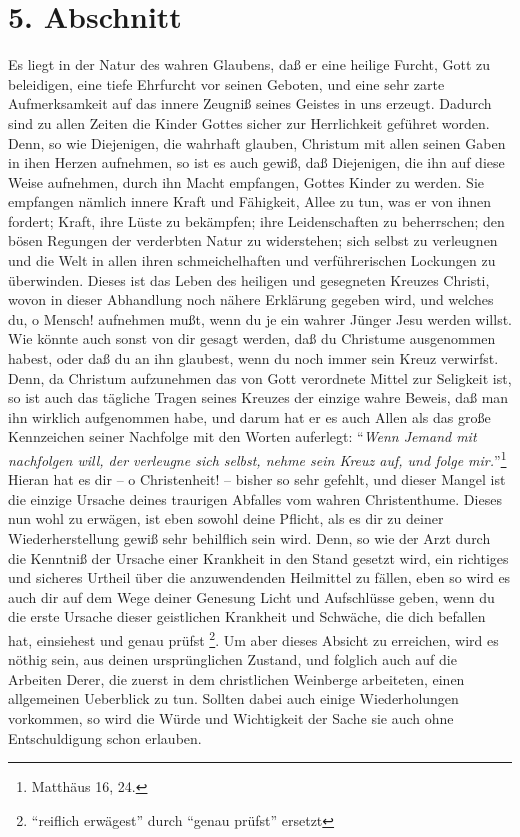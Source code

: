 \section{5. Abschnitt}  \label{kap2_ab5}

Es liegt in der Natur des wahren Glaubens, daß er eine heilige Furcht, Gott zu
beleidigen, eine tiefe Ehrfurcht vor seinen Geboten, und eine sehr zarte
Aufmerksamkeit auf das innere Zeugniß seines Geistes in uns erzeugt. Dadurch
sind zu allen Zeiten die Kinder Gottes sicher zur Herrlichkeit geführet worden.
Denn, so wie Diejenigen, die wahrhaft glauben, Christum mit allen seinen Gaben
in ihen Herzen aufnehmen, so ist es auch gewiß, daß Diejenigen, die ihn auf
diese Weise aufnehmen, durch ihn Macht empfangen, Gottes Kinder zu werden. Sie
empfangen nämlich innere Kraft und Fähigkeit, Allee zu tun, was er von ihnen
fordert; Kraft, ihre Lüste zu bekämpfen; ihre Leidenschaften zu beherrschen; den
bösen Regungen der verderbten Natur zu widerstehen; sich selbst zu verleugnen
und die Welt in allen ihren schmeichelhaften und verführerischen Lockungen zu
überwinden. Dieses ist das Leben des heiligen und gesegneten Kreuzes Christi,
wovon in dieser Abhandlung noch nähere Erklärung gegeben wird, und welches du, o
Mensch! aufnehmen mußt, wenn du je ein wahrer Jünger Jesu werden willst. Wie
könnte auch sonst von dir gesagt werden, daß du Christume ausgenommen habest,
oder daß du an ihn glaubest, wenn du noch immer sein Kreuz verwirfst. Denn, da
Christum aufzunehmen das von Gott verordnete Mittel zur Seligkeit ist, so ist
auch das tägliche Tragen seines Kreuzes der einzige wahre Beweis, daß man ihn
wirklich aufgenommen habe, und darum hat er es auch Allen als das große
Kennzeichen seiner Nachfolge mit den Worten auferlegt: "`\textit{Wenn Jemand mit
nachfolgen will, der verleugne sich selbst, nehme sein Kreuz auf, und folge
mir.}"'\footnote{Matthäus 16, 24.}
Hieran hat es dir -- o Christenheit! -- bisher so sehr gefehlt, und dieser
Mangel ist
die einzige Ursache deines traurigen Abfalles vom wahren Christenthume. Dieses
nun wohl zu erwägen, ist eben sowohl deine Pflicht, als es dir zu deiner
Wiederherstellung gewiß sehr behilflich sein wird. Denn, so wie der Arzt durch
die Kenntniß der Ursache einer Krankheit in den Stand gesetzt wird, ein
richtiges und sicheres Urtheil über die anzuwendenden Heilmittel zu fällen, eben
so wird es auch dir auf dem Wege deiner Genesung Licht und Aufschlüsse geben,
wenn du die erste Ursache dieser geistlichen Krankheit und Schwäche, die dich
befallen hat, einsiehest und genau prüfst \footnote{"`reiflich erwägest"' durch
"`genau prüfst"' ersetzt}. Um aber dieses Absicht zu
erreichen, wird es nöthig sein, aus deinen ursprünglichen Zustand, und folglich
auch auf die Arbeiten Derer, die zuerst in dem christlichen Weinberge
arbeiteten, einen allgemeinen Ueberblick zu tun. Sollten dabei auch einige
Wiederholungen vorkommen, so wird die Würde und Wichtigkeit der Sache sie auch
ohne Entschuldigung schon erlauben.

